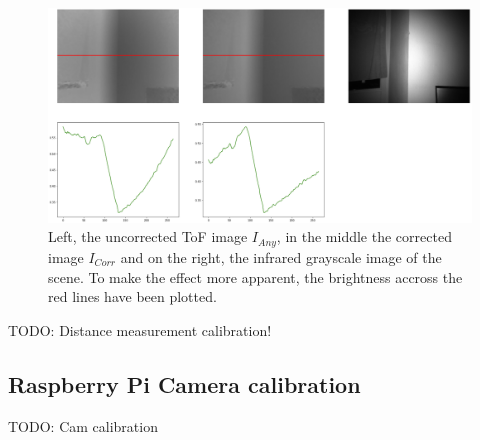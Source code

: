 \begin{figure}[H]
    \centering
    \includegraphics[width=1.0\textwidth]{images/flattened_tof_example.png}
    \caption{Left, the uncorrected ToF image $I_{Any}$, in the middle the corrected image $I_{Corr}$ and on the right, the infrared grayscale image of the scene. To make the effect more apparent, the brightness accross the red lines have been plotted.}
    \label{im:ToFCorrected}
\end{figure}


TODO: Distance measurement calibration!
\subsection{Raspberry Pi Camera calibration}
\label{sec:RBPiCalibration}
TODO: Cam calibration
